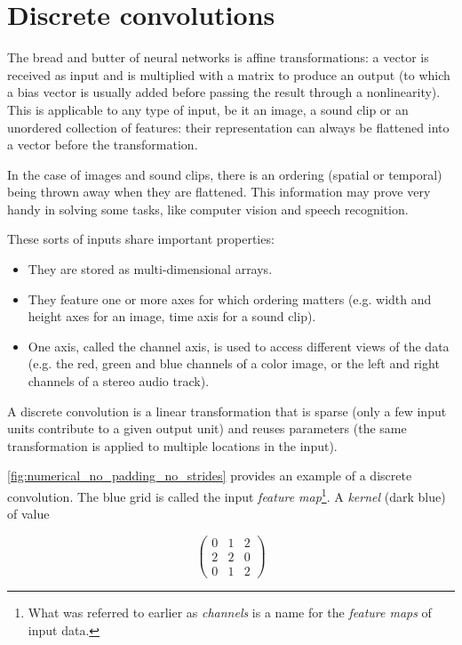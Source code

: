 \documentclass{report}
\begin{document}
\section{Discrete convolutions}

The bread and butter of neural networks is affine transformations: a vector is
received as input and is multiplied with a matrix to produce an output (to which
a bias vector is usually added before passing the result through a
nonlinearity). This is applicable to any type of input, be it an image, a sound
clip or an unordered collection of features: their representation can always be
flattened into a vector before the transformation.

In the case of images and sound clips, there is an ordering (spatial or
temporal) being thrown away when they are flattened. This information may prove
very handy in solving some tasks, like computer vision and speech recognition.

These sorts of inputs share important properties:

\begin{itemize}
    \item They are stored as multi-dimensional arrays.
    \item They feature one or more axes for which ordering matters (e.g. width
        and height axes for an image, time axis for a sound clip).
    \item One axis, called the channel axis, is used to access different views
        of the data (e.g. the red, green and blue channels of a color image, or
        the left and right channels of a stereo audio track).
\end{itemize}

A discrete convolution is a linear transformation that is sparse (only a few
input units contribute to a given output unit) and reuses parameters (the same
transformation is applied to multiple locations in the input).

\autoref{fig:numerical_no_padding_no_strides} provides an example of a discrete
convolution. The blue grid is called the input {\em feature map}\footnote{
    What was referred to earlier as {\em channels} is a name for the {\em
    feature maps} of input data.}.
A {\em kernel} (dark blue) of value

\begin{equation*}
\begin{pmatrix}
    0 & 1 & 2 \\
    2 & 2 & 0 \\
    0 & 1 & 2
\end{pmatrix}
\end{equation*}
\end{document}
